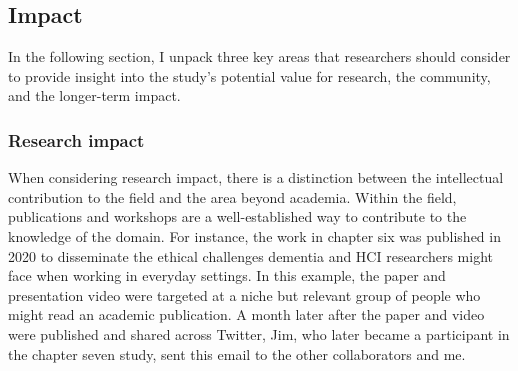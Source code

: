 \subsection{Impact}
\label{Impact}
In the following section, I unpack three key areas that researchers should consider to provide insight into the study's potential value for research, the community, and the longer-term impact.

\subsubsection{Research impact}
When considering research impact, there is a distinction between the intellectual contribution to the field and the area beyond academia. Within the field, publications and workshops are a well-established way to contribute to the knowledge of the domain. For instance, the work in chapter six was published in 2020 to disseminate the ethical challenges dementia and HCI researchers might face when working in everyday settings. In this example, the paper and presentation video were targeted at a niche but relevant group of people who might read an academic publication. A month later after the paper and video were published and shared across Twitter, Jim, who later became a participant in the chapter seven study, sent this email to the other collaborators and me.

